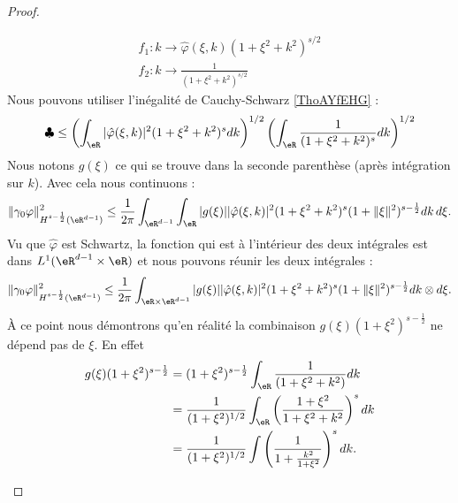 \begin{proof}
\begin{subproof}
\begin{subequations}
                \begin{align}
                    f_1\colon k\to \hat \varphi(\xi,k)(1+\xi^2+k^2)^{s/2}\\
                    f_2\colon k\to \frac{1}{ (1+\xi^2+k^2)^{s/2} }
                \end{align}
            \end{subequations}
            Nous pouvons utiliser l'inégalité de Cauchy-Schwarz \ref{ThoAYfEHG} :
            \begin{equation}
                \clubsuit\leq \left( \int_{\eR}| \hat \varphi(\xi,k) |^2(1+\xi^2+k^2)^sdk \right)^{1/2}\left( \int_{\eR}\frac{1}{ (1+\xi^2+k^2)^s }dk \right)^{1/2}
            \end{equation}
            Nous notons \( g(\xi)\) ce qui se trouve dans la seconde parenthèse (après intégration sur \( k\)). Avec cela nous continuons :
            \begin{equation}
                \| \gamma_0\varphi \|^2_{H^{s-\frac{ 1 }{2}}(\eR^{d-1})}\leq\frac{1}{ 2\pi }\int_{\eR^{d-1}}\int_{\eR}| g(\xi) | |\hat \varphi(\xi,k) |^2(1+\xi^2+k^2)^s(1+\| \xi \|^2)^{s-\frac{ 1 }{2}}dk\,d\xi.
            \end{equation}
            Vu que \( \hat \varphi\) est Schwartz, la fonction qui est à l'intérieur des deux intégrales est dans \( L^1(\eR^{d-1}\times \eR)\) et nous pouvons réunir les deux intégrales :
            \begin{equation}
                \| \gamma_0\varphi \|^2_{H^{s-\frac{ 1 }{2}}(\eR^{d-1})}\leq\frac{1}{ 2\pi }\int_{\eR\times \eR^{d-1}}| g(\xi) | |\hat \varphi(\xi,k) |^2(1+\xi^2+k^2)^s(1+\| \xi \|^2)^{s-\frac{ 1 }{2}}dk\otimes d\xi.
            \end{equation}
            À ce point nous démontrons qu'en réalité la combinaison \( g(\xi)(1+\xi^2)^{s-\frac{ 1 }{2}}\) ne dépend pas de \( \xi\). En effet
            \begin{subequations}
                \begin{align}
                    g(\xi)(1+\xi^2)^{s-\frac{ 1 }{2}}&=(1+\xi^2)^{s-\frac{ 1 }{2}}\int_{\eR}\frac{1}{ (1+\xi^2+k^2) }dk\\
                    &=\frac{1}{ (1+\xi^2)^{1/2} }\int_{\eR}\left( \frac{ 1+\xi^2 }{ 1+\xi^2+k^2 } \right)^sdk\\
                    &=\frac{1}{ (1+\xi^2)^{1/2} }\int\left( \frac{1}{ 1+\frac{ k^2 }{ 1+\xi^2 } } \right)^sdk.
                \end{align}
            \end{subequations}

\end{subproof}
\end{proof}
